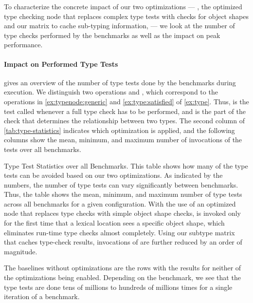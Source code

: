 To characterize the concrete impact of our two optimizations --- \ie,
the optimized type checking node that replaces complex type tests
with checks for object shapes and our matrix to cache sub-typing information,
--- we look at the number of type checks performed by the benchmarks
as well as the impact on peak performance.

\paragraph*{Impact on Performed Type Tests}

 gives an overview of the number of type tests done
by the benchmarks during execution.
We distinguish two operations  and ,
which correspond to the operations in
 \cref{ex:typenode:generic} and \cref{ex:type:satisfied} of \cref{ex:type}.
Thus,  is the test called
whenever a full type check has to be performed,
and  is the part of the check that
determines the relationship between two types.
The second column of \cref{tab:type-statistics} indicates
which optimization is applied,
and the following columns show the mean,
minimum, and maximum number of invocations of the tests
over all benchmarks.

\begin{table}[htb]
  \caption{Type Test Statistics over all Benchmarks.
  This table shows how many of the type tests can be avoided based on our two optimizations.
  As indicated by the numbers, the number of type tests can vary significantly
  between benchmarks.
  Thus, the table shows the mean, minimum, and maximum number of type tests
  across all benchmarks for a given configuration.
  With the use of an optimized node that replaces type checks with simple object shape checks,
   is invoked only for the first time that a lexical location
  sees a specific object shape, which eliminates run-time type checks almost completely.
  Using our subtype matrix that caches type-check results,
  invocations of  are further reduced by an order of magnitude.}
  \label{tab:type-statistics}

  \begin{center}
    \TypingStatsTable{}
  \end{center}
\end{table}

The baselines without optimizations are the rows with the results
for neither of the optimizations being enabled.
Depending on the benchmark,
we see that the type tests
are done tens of millions
to hundreds of millions times
for a single iteration of a benchmark.


